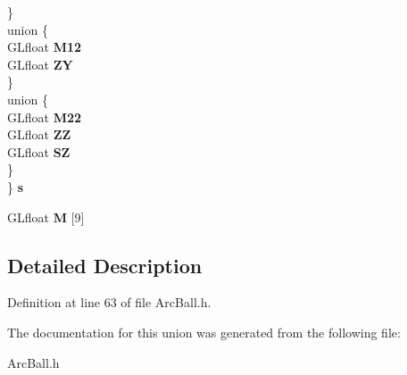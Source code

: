 \begin{DoxyCompactItemize}
\begin{tabbing}
\>\} \label{structMatrix3f__t_1_1@3_a8db2404e8fd22d46dfa9f6e41082bcc0}
\\
\>union \{\\
\>\>GLfloat {\bfseries M12}\\
\>\>GLfloat {\bfseries ZY}\\
\>\} \label{structMatrix3f__t_1_1@3_ae54d52933c212c64eb127ab021208cb1}
\\
\>union \{\\
\>\>GLfloat {\bfseries M22}\\
\>\>GLfloat {\bfseries ZZ}\\
\>\>GLfloat {\bfseries SZ}\\
\>\} \label{structMatrix3f__t_1_1@3_a8210d8dfedccff800d32091319b6d0ff}
\\
\} {\bfseries s}\label{unionMatrix3f__t_a9b16fbec4c0ede6e9bc7cf3e403c0f0c}
\\

\end{tabbing}\item 
G\-Lfloat {\bfseries M} [9]\label{unionMatrix3f__t_aef25d1c67298f304936bf182ac1d51f9}

\end{DoxyCompactItemize}


\subsection{Detailed Description}


Definition at line 63 of file Arc\-Ball.\-h.



The documentation for this union was generated from the following file\-:\begin{DoxyCompactItemize}
\item 
Arc\-Ball.\-h\end{DoxyCompactItemize}
